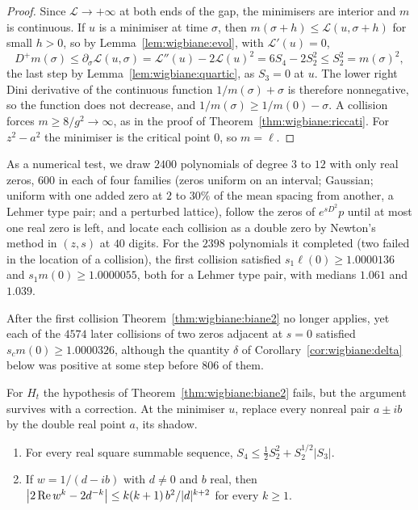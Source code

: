 \begin{proof}
Since $\mathcal L\to+\infty$ at both ends of the gap, the minimisers are interior and $m$ is continuous. If $u$ is a minimiser at time $\sigma$, then $m(\sigma+h)\le\mathcal L(u,\sigma+h)$ for small $h>0$, so by Lemma~\ref{lem:wigbiane:evol}, with $\mathcal L'(u)=0$,
\[
D^+m(\sigma)\le\partial_\sigma\mathcal L(u,\sigma)=\mathcal L''(u)-2\mathcal L(u)^2=6S_4-2S_2^2\le S_2^2=m(\sigma)^2,
\]
the last step by Lemma~\ref{lem:wigbiane:quartic}, as $S_3=0$ at $u$. The lower right Dini derivative of the continuous function $1/m(\sigma)+\sigma$ is therefore nonnegative, so the function does not decrease, and $1/m(\sigma)\ge1/m(0)-\sigma$. A collision forces $m\ge8/g^2\to\infty$, as in the proof of Theorem~\ref{thm:wigbiane:riccati}. For $z^2-a^2$ the minimiser is the critical point $0$, so $m=\ell$.
\end{proof}

As a numerical test, we draw $2400$ polynomials of degree $3$ to $12$ with only real zeros, $600$ in each of four families (zeros uniform on an interval; Gaussian; uniform with one added zero at $2$ to $30\%$ of the mean spacing from another, a Lehmer type pair; and a perturbed lattice), follow the zeros of $e^{sD^2}p$ until at most one real zero is left, and locate each collision as a double zero by Newton's method in $(z,s)$ at $40$ digits. For the $2398$ polynomials it completed (two failed in the location of a collision), the first collision satisfied $s_1\ell(0)\ge1.0000136$ and $s_1m(0)\ge1.0000055$, both for a Lehmer type pair, with medians $1.061$ and $1.039$.

After the first collision Theorem~\ref{thm:wigbiane:biane2} no longer applies, yet each of the $4574$ later collisions of two zeros adjacent at $s=0$ satisfied $s_cm(0)\ge1.0000326$, although the quantity $\delta$ of Corollary~\ref{cor:wigbiane:delta} below was positive at some step before $806$ of them.

For $H_t$ the hypothesis of Theorem~\ref{thm:wigbiane:biane2} fails, but the argument survives with a correction. At the minimiser $u$, replace every nonreal pair $a\pm ib$ by the double real point $a$, its shadow.

\begin{lemma}\label{lem:wigbiane:shadow}
\begin{enumerate}
\item[(i)] For every real square summable sequence, $S_4\le\frac12S_2^2+S_2^{1/2}|S_3|$.
\item[(ii)] If $w=1/(d-ib)$ with $d\ne0$ and $b$ real, then $\big|2\operatorname{Re} w^k-2d^{-k}\big|\le k(k+1)\,b^2/|d|^{k+2}$ for every $k\ge1$.
\end{enumerate}
\end{lemma}

